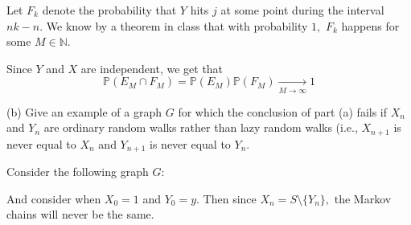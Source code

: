 \documentclass[11pt]{article}
\newcommand{\bbN}{\mathbb{N}}
\newcommand{\bbP}{\mathbb{P}}
\begin{document}
\begin{problem}
\begin{solution}
    Let $F_k$ denote the probability that $Y$ hits $j$ at some point during the interval $nk - n.$ We know by a theorem in class that with probability $1,$ $F_k$ happens for some $M \in \bbN.$ 

    Since $Y$ and $X$ are independent, we get that 
    \[\bbP(E_M \cap F_M) = \bbP(E_M)\bbP(F_M) \xrightarrow[M\to \infty]{}1\]
\end{solution}

(b) Give an example of a graph \( G \) for which the conclusion of part (a) fails if \( X_n \) and \( Y_n \) are ordinary random walks rather than lazy random walks (i.e., \( X_{n+1} \) is never equal to \( X_n \) and \( Y_{n+1} \) is never equal to \( Y_n \).
\begin{solution}
Consider the following graph $G:$
    \begin{center}
\end{center}
And consider when $X_0 = 1$ and $Y_0 = y.$ Then since $X_n = S\setminus\{Y_n\},$ the Markov chains will never be the same.
\end{solution}

\end{problem}
\end{document}
